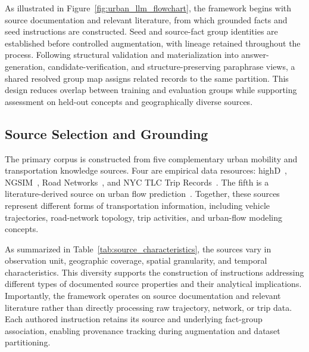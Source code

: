 \documentclass[a4paper,fleqn]{cas-sc}
\begin{document}
As illustrated in Figure~\ref{fig:urban_llm_flowchart}, the framework begins with source documentation and relevant literature, from which grounded facts and seed instructions are constructed. Seed and source-fact group identities are established before controlled augmentation, with lineage retained throughout the process. Following structural validation and materialization into answer-generation, candidate-verification, and structure-preserving paraphrase views, a shared resolved group map assigns related records to the same partition. This design reduces overlap between training and evaluation groups while supporting assessment on held-out concepts and geographically diverse sources.

\subsection{Source Selection and Grounding}
\label{sec:source-grounding}

The primary corpus is constructed from five complementary urban mobility and transportation knowledge sources. Four are empirical data resources: highD~\cite{highd2024dataset}, NGSIM~\cite{ngsim2024dataset}, Road Networks~\cite{networkrepository2024road}, and NYC TLC Trip Records~\cite{nyc2024tlc}. The fifth is a literature-derived source on urban flow prediction~\cite{xie2020urbanflow}. Together, these sources represent different forms of transportation information, including vehicle trajectories, road-network topology, trip activities, and urban-flow modeling concepts.

As summarized in Table~\ref{tab:source_characteristics}, the sources vary in observation unit, geographic coverage, spatial granularity, and temporal characteristics. This diversity supports the construction of instructions addressing different types of documented source properties and their analytical implications. Importantly, the framework operates on source documentation and relevant literature rather than directly processing raw trajectory, network, or trip data. Each authored instruction retains its source and underlying fact-group association, enabling provenance tracking during augmentation and dataset partitioning.
\end{document}

